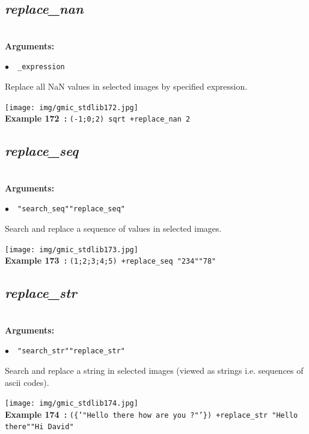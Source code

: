 \documentclass[a4paper,10.5pt,twoside]{book}
\def\comma{\discretionary{,}{}{,}}
\newcommand{\Cb}[1]{\textcolor{cb}{#1}}
\begin{document}
\subsection{\emph{replace\_nan} }\vspace*{-0.7em}
~\\\textbf{\Cb{Arguments: }}\begin{flushleft}
{\small \Cb{\hspace*{0.5cm}$\bullet$~~\texttt{\_expression}}}\end{flushleft}
Replace all NaN values in selected images by specified expression.
\begin{center}\texttt{[image: img/gmic\_stdlib172.jpg]}\\
{\footnotesize \textbf{Example 172~:} \texttt{(-1;0;2) sqrt +replace\_nan 2}}
\end{center}

\subsection{\emph{replace\_seq} }\vspace*{-0.7em}
~\\\textbf{\Cb{Arguments: }}\begin{flushleft}
{\small \Cb{\hspace*{0.5cm}$\bullet$~~\texttt{"search\_seq"{\comma}"replace\_seq"}}}\end{flushleft}
Search and replace a sequence of values in selected images.
\begin{center}\texttt{[image: img/gmic\_stdlib173.jpg]}\\
{\footnotesize \textbf{Example 173~:} \texttt{(1;2;3;4;5) +replace\_seq "2{\comma}3{\comma}4"{\comma}"7{\comma}8"}}
\end{center}

\subsection{\emph{replace\_str} }\vspace*{-0.7em}
~\\\textbf{\Cb{Arguments: }}\begin{flushleft}
{\small \Cb{\hspace*{0.5cm}$\bullet$~~\texttt{"search\_str"{\comma}"replace\_str"}}}\end{flushleft}
Search and replace a string in selected images (viewed as strings{\comma} i.e. sequences of ascii codes).
\begin{center}\texttt{[image: img/gmic\_stdlib174.jpg]}\\
{\footnotesize \textbf{Example 174~:} \texttt{(\{'"Hello there{\comma} how are you ?"'\}) +replace\_str "Hello there"{\comma}"Hi David"}}
\end{center}
\end{document}
